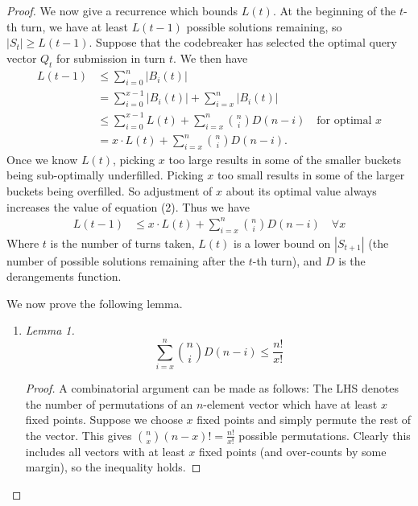 \documentclass[12pt, a4paper]{article}
\begin{document}
\begin{proof}
		 We now give a recurrence which bounds $L(t)$. At the beginning of the $t$-th turn, we have at least $L(t-1)$ possible solutions remaining, so $|S_t|\ge L(t-1)$. Suppose that the codebreaker has selected the optimal query vector $Q_t$ for submission in turn $t$. We then have 
		\begin{align}
			L(t-1)
			& \le \sum_{i = 0}^{n}|B_i(t)|\nonumber\\
			& = \sum_{i=0}^{x-1}|B_i(t)| + \sum_{i=x}^{n}|B_i(t)|\nonumber\\
			& \le \sum_{i = 0}^{x-1}L(t) + \sum_{i=x}^{n}\binom{n}{i}D(n-i)\quad
			\text{for optimal $x$}\nonumber\\
			& = x\cdot L(t) + \sum_{i = x}^{n}\binom{n}{i}D(n-i).
		\end{align}
		Once we know $L(t)$, picking $x$ too large results in some of the smaller buckets being sub-optimally underfilled. Picking $x$ too small results in some of the larger buckets being overfilled. So adjustment of $x$ about its optimal value always increases the value of equation (2). Thus we have
		\begin{align*}
			L(t-1) & \le x\cdot L(t) + \sum_{i=x}^n\binom{n}{i}D(n-i)\quad\forall x
		\end{align*}
		Where $t$ is the number of turns taken, $L(t)$ is a lower bound on $|S_{t+1}|$ (the number of possible solutions remaining after the $t$-th turn), and $D$ is the derangements function.
		
		We now prove the following lemma.
		\begin{enumerate}[label=]
			\item\textit{Lemma 1.}
			\begin{equation*}
				\sum_{i=x}^n\binom{n}{i}D(n-i) \le \frac{n!}{x!}
			\end{equation*}
			\begin{proof}
				A combinatorial argument can be made as follows: The LHS	 denotes the number of permutations of an $n$-element vector which have	 at least $x$ fixed points. Suppose we choose $x$ fixed points and simply permute the rest of the vector. This gives $\binom{n}{x}(n-x)!=\frac{n!}{x!}$ possible permutations. Clearly this includes all vectors with at least $x$ fixed points (and over-counts by some margin), so the inequality holds.
				

\end{proof}
\end{enumerate}
\end{proof}
\end{document}
